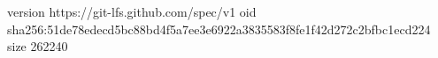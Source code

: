 version https://git-lfs.github.com/spec/v1
oid sha256:51de78edecd5bc88bd4f5a7ee3e6922a3835583f8fe1f42d272c2bfbc1ecd224
size 262240
